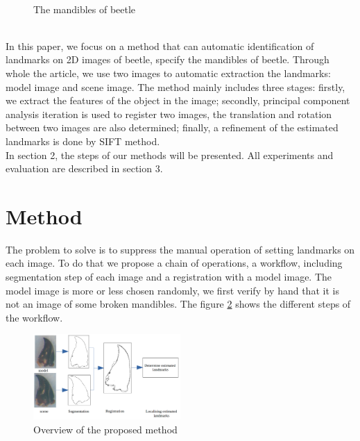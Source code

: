 \documentclass[twoside,twocolumn,10pt]{article}
\begin{document}
\begin{figure}[h]
\centering
{}~~
\caption{The mandibles of beetle}
\label{figparts}
\end{figure}~\\[0.1cm]
In this paper, we focus on a method that can automatic identification
of landmarks on 2D images of beetle, specify the mandibles of
beetle. Through whole the article, we use two images to automatic
extraction the landmarks: model image and scene image. The method
mainly includes three stages: firstly, we extract the features of the
object in the image; secondly, principal component analysis iteration is 
used to register two images, the translation and
rotation between two images are also determined; finally, a refinement of
the estimated landmarks is done by SIFT method.\\[0.1cm]

In section 2, the steps of our methods will be presented. All
experiments and evaluation are described in section 3. 

\section{Method}
The problem to solve is to suppress the manual operation of setting
landmarks on each image. To do that we propose a chain of operations,
a workflow, including segmentation step of each image and a registration
with a model image. The model image is more or less chosen randomly, we first
verify by hand that it is not an image of some broken mandibles. The 
figure \ref{fig:method} shows the different steps of the workflow. \\
\begin{figure}[htb]
    \centering
    \includegraphics[width=0.5\textwidth]{./images/method}
    \caption{Overview of the proposed method}
    \label{fig:method}
\end{figure}~\\
\end{document}

